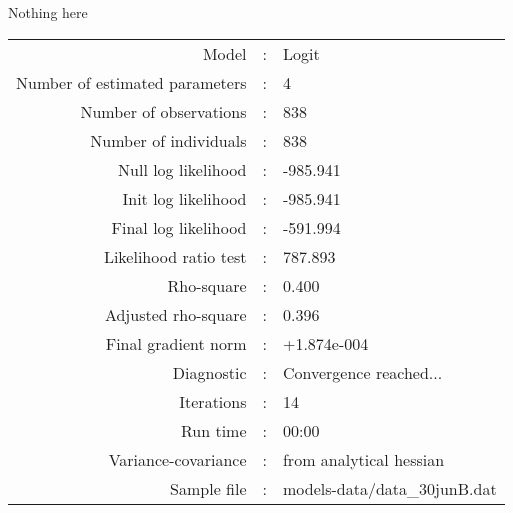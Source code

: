 Nothing here\\


\begin{flushleft}
\begin{tabular}{rcl}
\hline
Model &:& Logit\\
Number of estimated parameters&:&4\\
Number of  observations &:& 838\\
Number of individuals&:&838\\
Null log likelihood&:&-985.941\\
Init log likelihood&:&-985.941\\
Final log likelihood&:&-591.994\\
Likelihood ratio test &:&787.893\\
Rho-square&:&0.400\\
Adjusted rho-square&:&0.396\\
Final gradient norm&:&+1.874e-004\\
Diagnostic&:&Convergence reached...\\
Iterations&:&14\\
Run time&:&00:00\\
Variance-covariance&:&from analytical hessian
\\
Sample file&:&models-data/data_30junB.dat\\
\end{tabular}
\end{flushleft}
